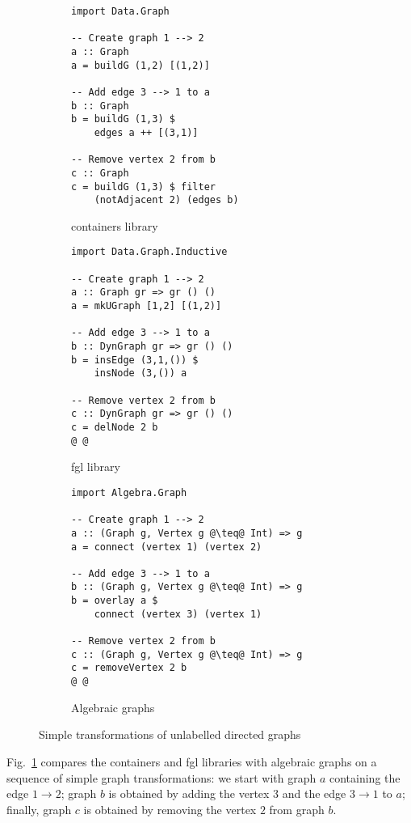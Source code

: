 \begin{figure}
\begin{subfigure}[b]{0.28\linewidth}
\begin{verbatim}
import Data.Graph

-- Create graph 1 --> 2
a :: Graph
a = buildG (1,2) [(1,2)]

-- Add edge 3 --> 1 to a
b :: Graph
b = buildG (1,3) $
    edges a ++ [(3,1)]

-- Remove vertex 2 from b
c :: Graph
c = buildG (1,3) $ filter
    (notAdjacent 2) (edges b)
\end{verbatim}
\caption{\textsf{containers} library}
\end{subfigure}
\hfill
\hfill
\vrule
\hfill
\hfill
\begin{subfigure}[b]{0.3\linewidth}
\begin{verbatim}
import Data.Graph.Inductive

-- Create graph 1 --> 2
a :: Graph gr => gr () ()
a = mkUGraph [1,2] [(1,2)]

-- Add edge 3 --> 1 to a
b :: DynGraph gr => gr () ()
b = insEdge (3,1,()) $
    insNode (3,()) a

-- Remove vertex 2 from b
c :: DynGraph gr => gr () ()
c = delNode 2 b
@ @
\end{verbatim}
\caption{\textsf{fgl} library}
\end{subfigure}
\hfill
\vrule
\hfill
\hfill
\begin{subfigure}[b]{0.35\linewidth}
\begin{verbatim}
import Algebra.Graph

-- Create graph 1 --> 2
a :: (Graph g, Vertex g @\teq@ Int) => g
a = connect (vertex 1) (vertex 2)

-- Add edge 3 --> 1 to a
b :: (Graph g, Vertex g @\teq@ Int) => g
b = overlay a $
    connect (vertex 3) (vertex 1)

-- Remove vertex 2 from b
c :: (Graph g, Vertex g @\teq@ Int) => g
c = removeVertex 2 b
@ @
\end{verbatim}
\caption{Algebraic graphs}
\end{subfigure}
\caption{Simple transformations of unlabelled directed graphs\label{fig-example}}
\vspace{-4mm}
\end{figure}

Fig.~\ref{fig-example} compares the \textsf{containers} and
\textsf{fgl} libraries with algebraic graphs on a sequence of
simple graph transformations: we start with graph $a$ containing the
edge $1 \rightarrow 2$; graph $b$ is obtained by adding the vertex $3$
and the edge $3 \rightarrow 1$ to $a$; finally, graph $c$ is obtained by removing
the vertex $2$ from graph $b$.

